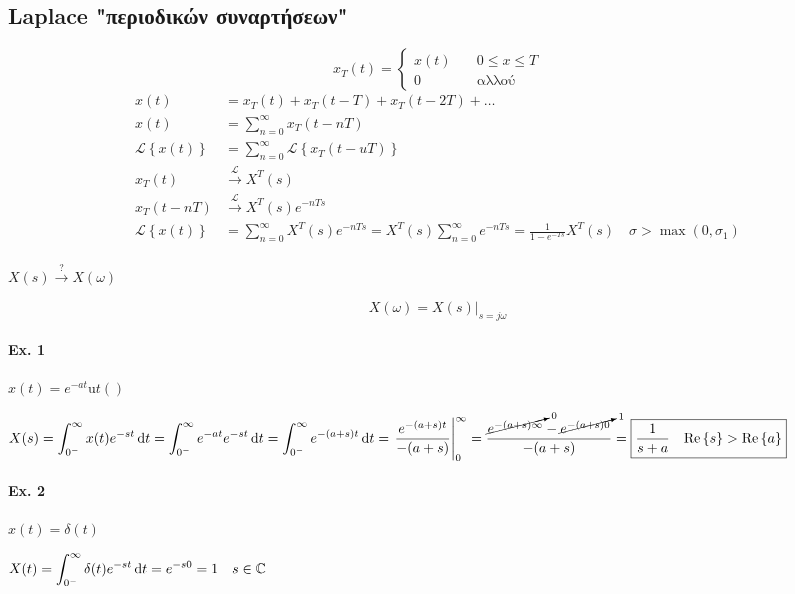 \documentclass[11pt,a4paper,titlepage,fleqn]{article}
\begin{document}
	\subsection{Laplace "περιοδικών συναρτήσεων"}
	\[
	x_T(t)=\begin{cases}
	x(t) &\quad 0\leq x \leq T \\
	0 &\quad \text{αλλού}
	\end{cases}
	\]
	\begin{align*}
	x(t)&=x_T(t)+x_T(t-T)+x_T(t-2T)+\dots\\
	x(t)&= \sum_{n=0}^\infty x_T (t-nT) \\
	\mathscr L\left\lbrace x(t) \right\rbrace &= \sum_{n=0}^\infty
	\mathscr L \left\lbrace x_T(t-uT) \right\rbrace \\[3pt]
	x_T(t) &\xrightarrow{\mathscr L} X^T(s)\\
	x_T(t-nT) &\xrightarrow{\mathscr L} X^T(s)e^{-nTs} \\
	\mathscr L\left\lbrace x(t) \right\rbrace
	&= \sum_{n=0}^\infty X^T(s)e^{-nTs}
	= X^T(s)\sum_{n=0}^\infty e^{-nTs} = \frac{1}{1-e^{-Ts}}X^T(s)
	\quad \sigma>\max(0,\sigma_1)
	\end{align*}
	
	\paragraph{}
	\( \displaystyle X(s) \xrightarrow{?} X(\omega ) \)
	
	\[
	X(\omega ) = \left. X(s)\right|_{s=j\omega }
	\]
	
	\paragraph{Ex. 1}
	\( x(t)= e^{-at}\mathrm ut() \)
	
	\( \displaystyle
	X(s) = \int_{0^-}^\infty x(t)e^{-st}\dif t
	=\int_{0^-}^\infty e^{-at}e^{-st}\dif t
	= \int_{0^-}^\infty e^{-(a+s)t}\dif t
	=\left. \frac{e^{-(a+s)t}}{-(a+s)}\right|_0^\infty
	= \frac{\cancelto{0}{e^{-(a+s)\infty}} -\cancelto{1}{e^{-(a+s)0}} }{-(a+s)}
	= \boxed{\frac{1}{s+a} \quad 
		\Re\left\lbrace s \right\rbrace > \Re\left\lbrace a \right\rbrace}
	 \)
	 
	 
   \paragraph{Ex. 2}
   \( x(t)=\delta(t) \)
   
   \( \displaystyle
   X(t) = \int_{0^-}^\infty \delta(t)e^{-st}\dif t = e^{-s0} = 1 \quad s\in\mathbb C 
    \)
    
\end{document}
